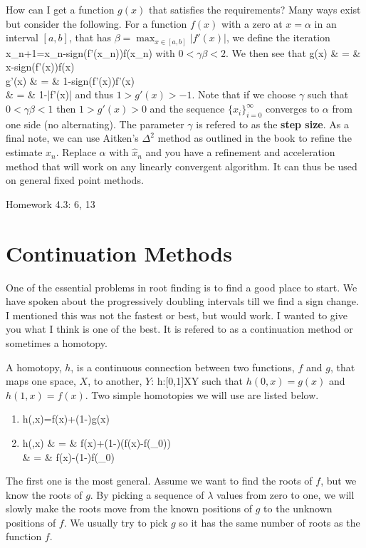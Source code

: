 How can I get a function $g(x)$ that satisfies the requirements?  
Many ways exist but consider the following.  For a function $f(x)$ with 
a zero at $x=\alpha$ in an interval $[a,b]$, that has 
$\beta=\max_{x\in[a,b]}|f'(x)|$, we define the iteration
\beqn
x_{n+1}=x_{n}-\gamma sign(f'(x_{n}))f(x_{n})
\eeqn
with $0<\gamma\beta<2$.  We then see that
\beqn
g(x) & = & x-\gamma sign(f'(x))f(x) \\
g'(x) & = & 1-\gamma sign(f'(x))f'(x) \\
      & = & 1-\gamma |f'(x)|
\eeqn
and thus $1>g'(x)>-1$.  Note that if we choose $\gamma$ such that 
$0<\gamma\beta<1$ then $1>g'(x)>0$ and the sequence 
$\{x_{i}\}_{i=0}^{\infty}$ converges to $\alpha$ from one side (no 
alternating).  The parameter $\gamma$ is refered to as the {\bf step 
size}.  As a final note, we can use Aitken's $\Delta^{2}$ method as 
outlined in the book to refine the estimate $x_{n}$.  Replace $\alpha$ 
with $\hat{x}_{n}$ and you have a refinement and acceleration method 
that will work on any linearly convergent algorithm.  It can thus be 
used on general fixed point methods.

Homework 
4.3: 6, 13
\newpage
\section{Continuation Methods}
One of the essential problems in root finding is to find a good place 
to start.  We have spoken about the progressively doubling intervals 
till we find a sign change.  I mentioned this was not the fastest or 
best, but would work.  I wanted to give you what I think is one of the 
best.  It is refered to as a continuation method or sometimes a 
homotopy.

A homotopy, $h$, is a continuous connection between two functions, $f$ and 
$g$, that maps one space, $X$, to another, $Y$:
\beqn
h:[0,1]\times X\rightarrow Y
\eeqn
such that $h(0,x)=g(x)$ and $h(1,x)=f(x)$.  Two simple homotopies we will 
use are listed below.
\begin{enumerate}
\item
\beqn
h(\lambda,x)=\lambda f(x)+(1-\lambda)g(x)
\eeqn
\item
\beqn
h(\lambda,x) & = & \lambda f(x)+(1-\lambda)(f(x)-f(\alpha_{0})) \\
             & = & f(x)-(1-\lambda)f(\alpha_{0})
\eeqn
\end{enumerate}
The first one is the most general.  Assume we want to find the roots 
of $f$, but we know the roots of $g$.  By picking a sequence of 
$\lambda$ values from zero to one, we will slowly make the roots move 
from the known positions of $g$ to the unknown positions of $f$.  We 
usually try to pick $g$ so it has the same number of roots as the 
function $f$.

